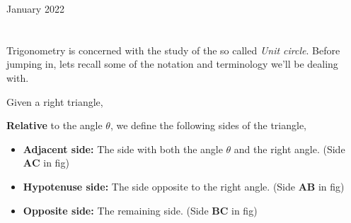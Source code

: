 \documentclass[12pt,oneside]{book} %
\begin{document}
	\renewcommand*{\term}{Term 2} %
	\renewcommand*{\coursecode}{MCR3U} %
	\renewcommand*{\coursename}{Course Name} %
	\renewcommand*{\thelecnum}{8} %
	\renewcommand*{\profname}{Prof Name} %
	\renewcommand*{\colink}{http://www.student.math.uwaterloo.ca/~c2kent} %
	\clearpage
	\pagestyle{classlecture}
\begin{lec}{January 2022}
	\chapter{\chapname\chaplec}

  Trigonometry is concerned with the study of the so called \textit{Unit circle}. Before jumping in, lets recall
  some of the notation and terminology we'll be dealing with.
  
  \begin{defn}
      Given a right triangle,

  \begin{center}
  \end{center}

  \textbf{Relative} to the angle $\theta$, we define the following sides of the triangle,
      \begin{itemize}
        \item \textbf{Adjacent side:} The side with both the angle $\theta$ and the right angle. (Side
          $\textbf{AC}$ in fig)
        \item \textbf{Hypotenuse side:} The side opposite to the right angle. (Side
          $\textbf{AB}$ in fig)
        \item \textbf{Opposite side:} The remaining side. (Side
          $\textbf{BC}$ in fig)
      \end{itemize}


\end{defn}
\end{lec}
\end{document}
